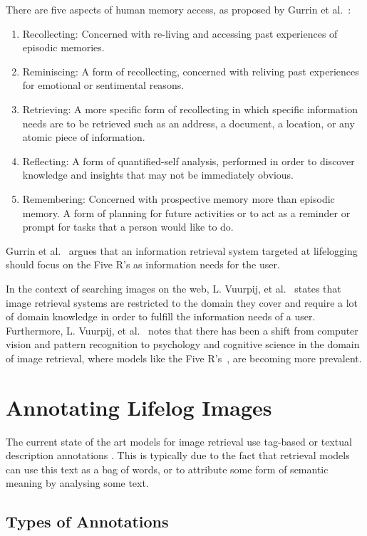 \documentclass[12pt,a4paper]{article}
\begin{document}
There are five aspects of human memory access, as proposed by Gurrin et al.~\citep{gurrin2014lifelogging}:
\begin{enumerate}
    \item Recollecting: Concerned with re-living and accessing past experiences of episodic memories.
    \item Reminiscing: A form of recollecting, concerned with reliving past experiences for emotional or sentimental reasons.
    \item Retrieving: A more specific form of recollecting  in which specific information needs are to be retrieved such as an address, a document, a location, or any atomic piece of information.
    \item Reflecting: A form of quantified-self analysis, performed in order to discover knowledge and insights that may not be immediately obvious.
    \item Remembering: Concerned with prospective memory more than episodic memory. A form of planning for future activities or to act as a reminder or prompt for tasks that a person would like to do.
\end{enumerate}
Gurrin et al.~\cite{gurrin2014lifelogging} argues that an information retrieval system targeted at lifelogging should focus on the Five R's as information needs for the user.

In the context of searching images on the web,  L. Vuurpij, et al.~\cite{vuurpij2002vind} states that image retrieval systems are restricted to the domain they cover and require a lot of domain knowledge in order to fulfill the information needs of a user. Furthermore, L. Vuurpij, et al.~\cite{vuurpij2002vind} notes that there has been a shift from computer vision and pattern recognition to psychology and cognitive science in the domain of image retrieval, where models like the Five R's~\cite{gurrin2014lifelogging}, are becoming more prevalent. 

\section{Annotating Lifelog Images}
The current state of the art models for image retrieval use tag-based or textual description annotations \citep{ali2010semantically}. This is typically due to the fact that retrieval models can use this text as a bag of words, or to attribute some form of semantic meaning by analysing some text.

\subsection{Types of Annotations}
\end{document}
